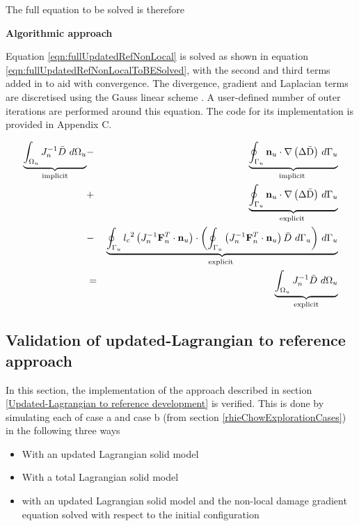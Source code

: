 \documentclass[sn-mathphys,Numbered,draft]{sn-jnl}%
\begin{document}
The full equation to be solved is therefore 

\textbf{Algorithmic approach}

Equation \ref{eqn:fullUpdatedRefNonLocal} is solved as shown in equation \ref{eqn:fullUpdatedRefNonLocalToBESolved}, with the second and third terms added in to aid with convergence. The divergence, gradient and Laplacian terms are discretised using the Gauss linear scheme \cite{noauthor_openfoam_2015}. A user-defined number of outer iterations are performed around this equation. The code for its implementation is provided in Appendix C.

\begin{eqnarray}
\label{eqn:fullUpdatedRefNonLocalToBESolved}
\underbrace{\int_{\mathrm{\Omega}_u} J^{-1}_n\bar{D}\ d\mathrm{\Omega}_u}_{\text {implicit}} &-& \underbrace{\oint_{\mathrm{\Gamma}_u}{\mathbf{n}_u\cdot\mathrm{\nabla}\left(\mathrm{\Delta \bar{D}}\right)}\ d\mathrm{\Gamma}_u}_{\text {implicit }} \notag \\
    &+&\underbrace{\oint_{\mathrm{\Gamma}_u}{\mathbf{n}_u\cdot\mathrm{\nabla}\left(\mathrm{\Delta \bar{D}}\right)}\ d\mathrm{\Gamma}_u}_{\text {explicit }} \notag \\
    &-&\underbrace{\oint_{\Gamma_u}{{l_c}^2 \left(J^{-1}_n\mathbf{F}_n^{T}\cdot \mathbf{n}_u\right)\cdot\left(\oint_{\Gamma_u}\left(J^{-1}_n\mathbf{F}_n^{T}\cdot \mathbf{n}_u\right)\bar{D}\ d\Gamma_u\right)}\ d\Gamma_u}_{\text {explicit }} \notag \\
    &=& \underbrace{\int_{\mathrm{\Omega}_u} J^{-1}_n\bar{D}\ d\mathrm{\Omega}_u}_{\text {explicit}}
\end{eqnarray}

\subsection{Validation of updated-Lagrangian to reference approach}

In this section, the implementation of the approach described in section \ref{Updated-Lagrangian to reference development} is verified. This is done by simulating each of case a and case b (from section \ref{rhieChowExplorationCases}) in the following three ways 
\begin{itemize}
    \item With an updated Lagrangian solid model
    \item With a total Lagrangian solid model
    \item with an updated Lagrangian solid model and the non-local damage gradient equation solved with respect to the initial configuration 
\end{itemize}
\end{document}
